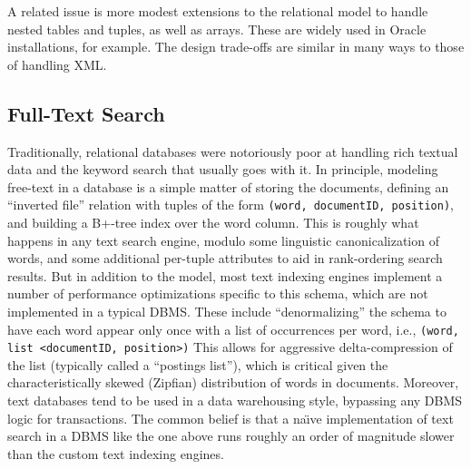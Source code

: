 \documentclass[a4paper,11pt,twoside,openright]{book}
\begin{document}
A related issue is more modest extensions to the relational model to
handle nested tables and tuples, as well as arrays. These are widely
used in Oracle installations, for example. The design trade-offs are
similar in many ways to those of handling XML.

\hypertarget{full-text-search}{%
\subsection{Full-Text Search}\label{full-text-search}}

Traditionally, relational databases were notoriously poor at handling
rich textual data and the keyword search that usually goes with it. In
principle, modeling free-text in a database is a simple matter of
storing the documents, defining an ``inverted file'' relation with
tuples of the form \texttt{(word, documentID, position)}, and building a B+-tree
index over the word column. This is roughly what happens in any text
search engine, modulo some linguistic canonicalization of words, and
some additional per-tuple attributes to aid in rank-ordering search
results. But in addition to the model, most text indexing engines
implement a number of performance optimizations specific to this schema,
which are not implemented in a typical DBMS. These include
``denormalizing'' the schema to have each word appear only once with a
list of occurrences per word, i.e., \texttt{(word, list \textless{}documentID,
position\textgreater{})} This allows for aggressive delta-compression of
the list (typically called a ``postings list''), which is critical given
the characteristically skewed (Zipfian) distribution of words in
documents. Moreover, text databases tend to be used in a data
warehousing style, bypassing any DBMS logic for transactions. The common
belief is that a na{\"\i}ve implementation of text search in a DBMS like the
one above runs roughly an order of magnitude slower than the custom text
indexing engines.
\end{document}
